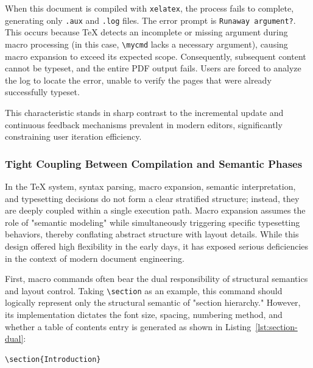 When this document is compiled with \texttt{xelatex}, the process fails to complete, generating only \texttt{.aux} and \texttt{.log} files. The error prompt is \texttt{Runaway argument?}. This occurs because \TeX{} detects an incomplete or missing argument during macro processing (in this case, \texttt{\textbackslash mycmd} lacks a necessary argument), causing macro expansion to exceed its expected scope. Consequently, subsequent content cannot be typeset, and the entire PDF output fails. Users are forced to analyze the log to locate the error, unable to verify the pages that were already successfully typeset.

This characteristic stands in sharp contrast to the incremental update and continuous feedback mechanisms prevalent in modern editors, significantly constraining user iteration efficiency.

\subsubsection{Tight Coupling Between Compilation and Semantic Phases}

In the \TeX{} system, syntax parsing, macro expansion, semantic interpretation, and typesetting decisions do not form a clear stratified structure; instead, they are deeply coupled within a single execution path. Macro expansion assumes the role of "semantic modeling" while simultaneously triggering specific typesetting behaviors, thereby conflating abstract structure with layout details. While this design offered high flexibility in the early days, it has exposed serious deficiencies in the context of modern document engineering.

First, macro commands often bear the dual responsibility of structural semantics and layout control. Taking \texttt{\textbackslash section} as an example, this command should logically represent only the structural semantic of "section hierarchy." However, its implementation dictates the font size, spacing, numbering method, and whether a table of contents entry is generated as shown in Listing~\ref{lst:section-dual}:

\begin{lstlisting}[caption={Section command with dual responsibility},label={lst:section-dual}]
\section{Introduction}
\end{lstlisting}

